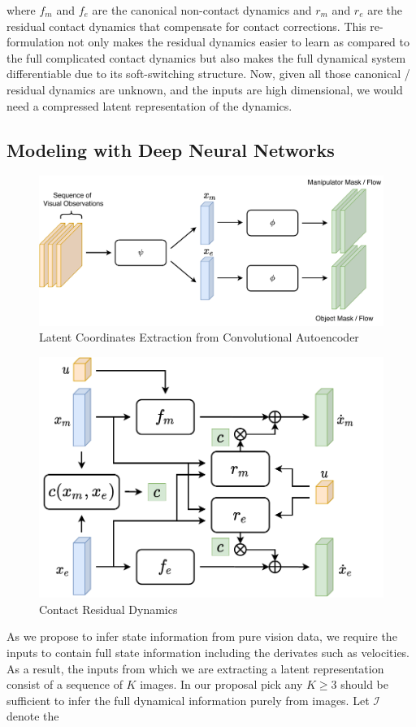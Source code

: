 \documentclass[conference]{IEEEtran}
\begin{document}
where $f_m$ and $f_e$ are the canonical non-contact dynamics and $r_m$ and
$r_e$ are the residual contact dynamics that compensate for contact corrections.
This re-formulation not only makes the residual dynamics easier to learn as
compared to the full complicated contact dynamics but also makes the full
dynamical system differentiable due to its soft-switching structure.
Now, given all those canonical / residual dynamics are unknown, and the
inputs are high dimensional, we would need a compressed latent representation
of the dynamics.

\subsection{Modeling with Deep Neural Networks}
\begin{figure}[hbt]
  \centering
  \includegraphics[width=.7\textwidth]{model_arch_ae}
  \caption{Latent Coordinates Extraction from Convolutional Autoencoder}
  \label{fig:model_ae}
\end{figure}
\begin{figure}[hbt]
  \centering
  \includegraphics[width=.48\textwidth]{model_arch_dyn}
  \caption{Contact Residual Dynamics}
  \label{fig:cont_dyn}
\end{figure}
As we propose to infer state information from pure vision data, we require the inputs
to contain full state information including the derivates such as velocities. As a
result, the inputs from which we are extracting a latent representation consist of
a sequence of $K$ images. In our proposal pick any $K \ge 3$ should be sufficient
to infer the full dynamical information purely from images. Let $\mathcal{I}$ denote the
\end{document}
